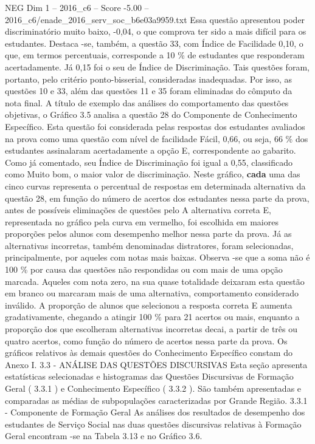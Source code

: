 \begin{textsample}{NEG Dim 1 – 2016\_c6 – Score -5.00 – 2016\_c6/enade\_2016\_serv\_soc\_b6e03a9959.txt}
Essa questão apresentou poder discriminatório muito baixo, -0,04, o que comprova ter sido a mais difícil para os estudantes.
Destaca -se, também, a questão 33, com Índice de Facilidade 0,10, o que, em termos percentuais, corresponde a 10 \% de estudantes que responderam acertadamente.
Já 0,15 foi o seu de Índice de Discriminação.
Tais questões foram, portanto, pelo critério ponto-bisserial, consideradas inadequadas.
Por isso, as questões 10 e 33, além das questões 11 e 35 foram eliminadas do cômputo da nota final.
A título de exemplo das análises do comportamento das questões objetivas, o Gráfico 3.5 analisa a questão 28 do Componente de Conhecimento Específico.
Esta questão foi considerada pelas respostas dos estudantes avaliados na prova como uma questão com nível de facilidade Fácil, 0,66, ou seja, 66 \% dos estudantes assinalaram acertadamente a opção E, correspondente ao gabarito.
Como já comentado, seu Índice de Discriminação foi igual a 0,55, classificado como Muito bom, o maior valor de discriminação.
Neste gráfico, \textbf{cada} uma das cinco curvas representa o percentual de respostas em determinada alternativa da questão 28, em função do número de acertos dos estudantes nessa parte da prova, antes de possíveis eliminações de questões pelo A alternativa correta E, representada no gráfico pela curva em vermelho, foi escolhida em maiores proporções pelos alunos com desempenho melhor nessa parte da prova.
Já as alternativas incorretas, também denominadas distratores, foram selecionadas, principalmente, por aqueles com notas mais baixas.
Observa -se que a soma não é 100 \% por causa das questões não respondidas ou com mais de uma opção marcada.
Aqueles com nota zero, na sua quase totalidade deixaram esta questão em branco ou marcaram mais de uma alternativa, comportamento considerado inválido.
A proporção de alunos que selecionou a resposta correta E aumenta gradativamente, chegando a atingir 100 \% para 21 acertos ou mais, enquanto a proporção dos que escolheram alternativas incorretas decai, a partir de três ou quatro acertos, como função do número de acertos nessa parte da prova.
Os gráficos relativos às demais questões do Conhecimento Específico constam do Anexo I. 3.3 - ANÁLISE DAS QUESTÕES DISCURSIVAS Esta seção apresenta estatísticas selecionadas e histogramas das Questões Discursivas de Formação Geral ( 3.3.1 ) e Conhecimento Específico ( 3.3.2 ).
São também apresentadas e comparadas as médias de subpopulações caracterizadas por Grande Região. 3.3.1 - Componente de Formação Geral As análises dos resultados de desempenho dos estudantes de Serviço Social nas duas questões discursivas relativas à Formação Geral encontram -se na Tabela 3.13 e no Gráfico 3.6.

\end{textsample}
